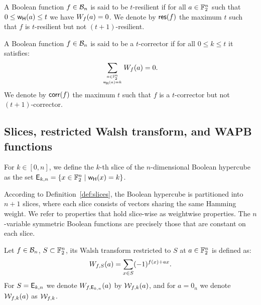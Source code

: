 \documentclass[11pt]{llncs}
\begin{document}
\begin{definition}[Resilience]\label{def:res}
	A Boolean function $f\in \mathcal{B}_{n}$ is said to be $t$-resilient if for all $a\in \mathbb{F}_2^n$ such that $0\le \mathsf{w_H}(a)\le t$ we have $W_{f}(a)=0$.
	We denote by $\mathsf{res}(f)$ the maximum $t$ such that $f$ is $t$-resilient but not $(t+1)$-resilient.
\end{definition}

\begin{definition}[Corrector]\label{def:corr}
	A Boolean function $f\in \mathcal{B}_{n}$ is said to be a $t$-corrector if for all $0\le k \le t$ it satisfies:
	\[\sum_{a\in \mathbb{F}_2^n \atop{\mathsf{w_H}(a)=k}} W_{f}(a)=0.\]
	We denote by $\mathsf{corr}(f)$ the maximum $t$ such that $f$ is a $t$-corrector but not $(t+1)$-corrector.
\end{definition}


\subsection{Slices, restricted Walsh transform, and WAPB functions}




\begin{definition}\label{def:slices}
	For $k \in [0,n]$, we define the $k$-th slice of the $n$-dimensional Boolean hypercube as the set $\mathsf{E}_{k,n} = \{x \in \mathbb{F}_2^n \mid \mathsf{w_H}(x) = k\}$.
\end{definition}

According to Definition~\ref{def:slices}, the Boolean hypercube is partitioned into $n+1$ slices, where each slice consists of vectors sharing the same Hamming weight.
We refer to properties that hold slice-wise as weightwise properties.
The $n$-variable symmetric Boolean functions are precisely those that are constant on each slice.



\begin{definition}\label{def:restWalsh}
	Let $f\in \mathcal{B}_{n}$, $S \subset \mathbb{F}_2^n$, its Walsh transform restricted to $S$ at $a \in \mathbb{F}_2^n$ is defined as:
	\[  W_{f,S} (a) = \sum_{x\in S} (-1)^{f(x)+ax}.\]
	For $S=\mathsf{E}_{k,n}$ we denote $W_{f,\mathsf{E}_{k,n}} (a)$ by $\mathcal{W}_{f,k}(a)$, and for $a= 0_{n}$ we denote $\mathcal{W}_{f,k}(a)$ as $\mathcal{W}_{f,k}$.

\end{definition}
\end{document}
